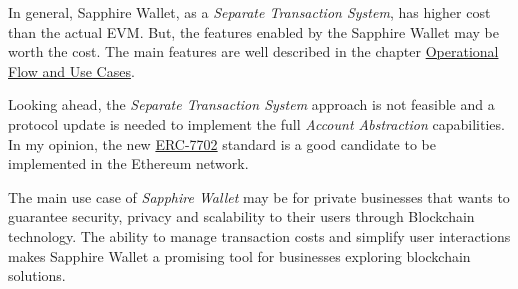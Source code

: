 
In general, Sapphire Wallet, as a \textit{Separate Transaction System}, has higher cost than the actual EVM. But, the features enabled by the Sapphire Wallet may be worth the cost. The main features are well described in the chapter \hyperref[sec:operational_flow_and_use_cases]{Operational Flow and Use Cases}. 

Looking ahead, the \textit{Separate Transaction System} approach is not feasible and a protocol update is needed to implement the full \textit{Account Abstraction} capabilities. In my opinion, the new \hyperref[subsubsec:erc-7702]{ERC-7702} standard is a good candidate to be implemented in the Ethereum network.


The main use case of \textit{Sapphire Wallet} may be for private businesses that wants to guarantee security, privacy and scalability to their users through Blockchain technology. The ability to manage transaction costs and simplify user interactions makes Sapphire Wallet a promising tool for businesses exploring blockchain solutions.